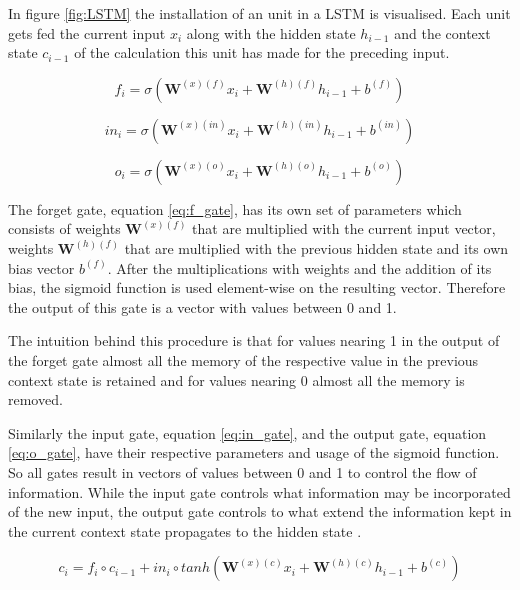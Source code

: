 In figure \ref{fig:LSTM} the installation of an unit in a LSTM is visualised. Each unit gets fed the current input $x_i$ along with the hidden state $h_{i-1}$ and the context state $c_{i-1}$ of the calculation this unit has made for the preceding input.

\begin{equation}
\label{eq:f_gate}
    f_i = \sigma(\textbf{W}^{(x) (f)} x_i + \textbf{W}^{(h) (f)} h_{i-1} + b^{(f)})
\end{equation}

\begin{equation}
\label{eq:in_gate}
    in_i = \sigma(\textbf{W}^{(x) (in)} x_i + \textbf{W}^{(h) (in)} h_{i-1} + b^{(in)})
\end{equation}

\begin{equation}
\label{eq:o_gate}
    o_i = \sigma(\textbf{W}^{(x) (o)} x_i + \textbf{W}^{(h) (o)} h_{i-1} + b^{(o)})
\end{equation}

The forget gate, equation \ref{eq:f_gate}, has its own set of parameters which consists of weights $\textbf{W}^{(x)(f)}$ that are multiplied with the current input vector, weights $\textbf{W}^{(h)(f)}$ that are multiplied with the previous hidden state and its own bias vector $b^{(f)}$. After the multiplications with weights and the addition of its bias, the sigmoid function is used element-wise on the resulting vector. 
Therefore the output of this gate is a vector with values between 0 and 1. 

The intuition behind this procedure is that for values nearing 1 in the output of the forget gate almost all the memory of the respective value in the previous context state is retained and for values nearing 0 almost all the memory is removed.

Similarly the input gate, equation \ref{eq:in_gate}, and the output gate, equation \ref{eq:o_gate}, have their respective parameters and usage of the sigmoid function. So all gates result in vectors of values between 0 and 1 to control the flow of information. While the input gate controls what information may be incorporated of the new input, the output gate controls to what extend the information kept in the current context state propagates to the hidden state \citep{embedding2020pilehvar}.

\begin{equation}
\label{eq:cstate}
    c_i = f_i \circ c_{i-1} + in_i \circ tanh(\textbf{W}^{(x) (c)} x_i + \textbf{W}^{(h) (c)} h_{i-1} + b^{(c)})
\end{equation}

